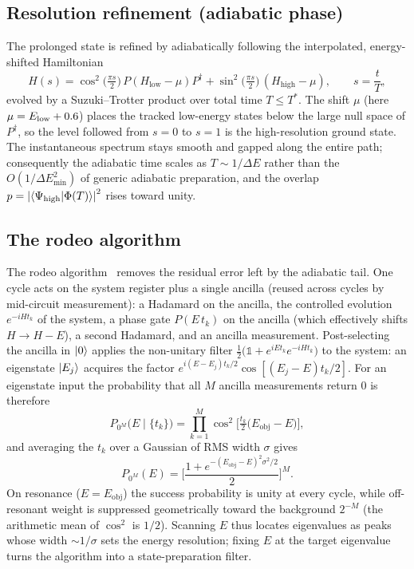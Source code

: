 \documentclass[11pt]{article}
\newcommand{\Hlow}{H_{\mathrm{low}}}
\newcommand{\Hhigh}{H_{\mathrm{high}}}
\newcommand{\Eobj}{E_{\mathrm{obj}}}
\begin{document}
\subsection{Resolution refinement (adiabatic phase)}
\label{sec:refine}
The prolonged state is refined by adiabatically following the interpolated,
energy-shifted Hamiltonian
\begin{equation}
  H(s)=\cos^2\!\Big(\tfrac{\pi s}{2}\Big)\,P(\Hlow-\mu)P^\dagger
      +\sin^2\!\Big(\tfrac{\pi s}{2}\Big)\,(\Hhigh-\mu),
  \qquad s=\frac{t}{T},
  \label{eq:path}
\end{equation}
evolved by a Suzuki--Trotter product over total time $T\le T^\ast$.  The shift $\mu$
(here $\mu=E_{\rm low}+0.6$) places the tracked low-energy states below the large
null space of $P^\dagger$, so the level followed from $s=0$ to $s=1$ is the
high-resolution ground state.  The instantaneous spectrum stays smooth and gapped
along the entire path; consequently the adiabatic time scales as $T\sim 1/\Delta E$
rather than the $O(1/\Delta E_{\min}^2)$ of generic adiabatic preparation, and the
overlap $p=\abs{\braket{\Psi_{\rm high}}{\Phi(T)}}^2$ rises toward unity.

\subsection{The rodeo algorithm}
\label{sec:rodeo}
The rodeo algorithm~\cite{Choi2021,Qian2024} removes the residual error left by the
adiabatic tail.  One cycle acts on the system register plus a single ancilla
(reused across cycles by mid-circuit measurement): a Hadamard on the ancilla, the
controlled evolution $e^{-iH t_k}$ of the system, a phase gate $P(E\,t_k)$ on the
ancilla (which effectively shifts $H\to H-E$), a second Hadamard, and an ancilla
measurement.  Post-selecting the ancilla in $\ket{0}$ applies the non-unitary filter
$\tfrac12\big(\mathbb{1}+e^{iE t_k}e^{-iH t_k}\big)$ to the system: an eigenstate
$\ket{E_j}$ acquires the factor $e^{i(E-E_j)t_k/2}\cos[(E_j-E)t_k/2]$.  For an
eigenstate input the probability that all $M$ ancilla measurements return $0$ is
therefore~\cite{Qian2024}
\begin{equation}
  P_{0^{M}}\!\big(E\mid\{t_k\}\big)=\prod_{k=1}^{M}
  \cos^2\!\Big[\tfrac{t_k}{2}\big(\Eobj-E\big)\Big],
  \label{eq:rodeo1}
\end{equation}
and averaging the $t_k$ over a Gaussian of RMS width $\sigma$ gives
\begin{equation}
  P_{0^{M}}(E)=\Bigg[\frac{1+e^{-(\Eobj-E)^2\sigma^2/2}}{2}\Bigg]^{M}.
  \label{eq:rodeo2}
\end{equation}
On resonance ($E=\Eobj$) the success probability is unity at every cycle, while
off-resonant weight is suppressed geometrically toward the background $2^{-M}$ (the
arithmetic mean of $\cos^2$ is $1/2$).  Scanning $E$ thus locates eigenvalues as
peaks whose width $\sim 1/\sigma$ sets the energy resolution; fixing $E$ at the
target eigenvalue turns the algorithm into a state-preparation filter.
\end{document}
